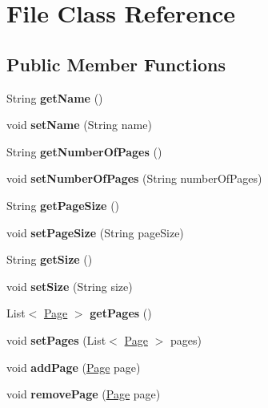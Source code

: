 \hypertarget{class_file}{}\section{File Class Reference}
\label{class_file}
\subsection*{Public Member Functions}
\begin{DoxyCompactItemize}
\item 
\mbox{\label{class_file_a8894ebafb0e0d02b743cf73271804cd4}} 
String {\bfseries get\+Name} ()
\item 
\mbox{\label{class_file_a5fdb0e6f6a22ef5429d931ea909a70c3}} 
void {\bfseries set\+Name} (String name)
\item 
\mbox{\label{class_file_a300d8462673f7d04df0e8c276c1dd0c7}} 
String {\bfseries get\+Number\+Of\+Pages} ()
\item 
\mbox{\label{class_file_a0170fe65bd607e6e2ab3c8d8a31b3ed1}} 
void {\bfseries set\+Number\+Of\+Pages} (String number\+Of\+Pages)
\item 
\mbox{\label{class_file_a2bc43a79a489b5412afc54b0746472a4}} 
String {\bfseries get\+Page\+Size} ()
\item 
\mbox{\label{class_file_ad0bd606687538998b16f35103049de00}} 
void {\bfseries set\+Page\+Size} (String page\+Size)
\item 
\mbox{\label{class_file_ab477bd725803406dcedde97235fa33df}} 
String {\bfseries get\+Size} ()
\item 
\mbox{\label{class_file_a0141f8a035522c2dcfc89a7752cce8d9}} 
void {\bfseries set\+Size} (String size)
\item 
\mbox{\label{class_file_aaaa026af6ce27d173c0d344d6f9d64b8}} 
List$<$ \hyperlink{class_page}{Page} $>$ {\bfseries get\+Pages} ()
\item 
\mbox{\label{class_file_ac1f6ee6460a105ab8e4ff63e0cac8954}} 
void {\bfseries set\+Pages} (List$<$ \hyperlink{class_page}{Page} $>$ pages)
\item 
\mbox{\label{class_file_af2e58a32c5666166510236e14f7e1cad}} 
void {\bfseries add\+Page} (\hyperlink{class_page}{Page} page)
\item 
\mbox{\label{class_file_a8d78d045156623b6068114e9e81a31cd}} 
void {\bfseries remove\+Page} (\hyperlink{class_page}{Page} page)
\end{DoxyCompactItemize}


